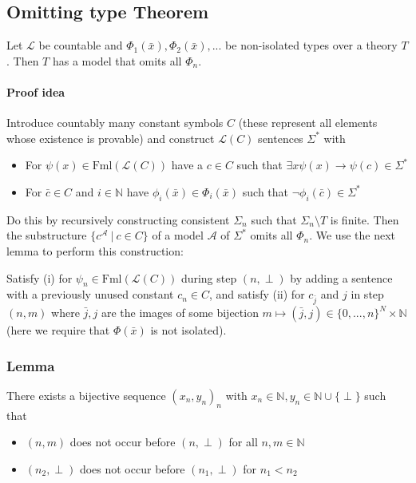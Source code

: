 \documentclass{scrartcl}
\newcommand{\N}{\mathbb{N}}
\begin{document}
\subsection{Omitting type Theorem}
\label{omitting_type_theorem}
Let $\mathcal{L}$ be countable and $\Phi_1(\bar{x}), \Phi_2(\bar{x}), ...$ be non-isolated types over a theory $T$.
Then $T$ has a model that omits all $\Phi_n$.
\paragraph{Proof idea} Introduce countably many constant symbols $C$ (these represent all elements whose existence is provable) and construct $\mathcal{L}(C)$ sentences $\Sigma^*$ with
\begin{itemize}
    \item For $\psi(x) \in \mathrm{Fml}(\mathcal{L}(C))$ have a $c \in C$ such that $\exists x \psi(x) \rightarrow \psi(c) \in \Sigma^*$ 
    \item For $\bar{c} \in C$ and $i \in \N$ have $\phi_i(\bar{x}) \in \Phi_i(\bar{x})$ such that $\neg\phi_i(\bar{c}) \in \Sigma^*$
\end{itemize}
Do this by recursively constructing consistent $\Sigma_n$ such that $\Sigma_n \setminus T$ is finite.
Then the substructure $\{ c^{\mathcal{A}} \ | \ c \in C \}$ of a model $\mathcal{A}$ of $\Sigma^*$ omits all $\Phi_n$.
We use the next lemma to perform this construction: 

Satisfy (i) for $\psi_n \in \mathrm{Fml}(\mathcal{L}(C))$ during step $(n, \perp)$ by adding a sentence with a previously unused constant $c_n \in C$, and satisfy (ii) for $c_{\bar{j}}$ and $j$ in step $(n, m)$ where $\bar{j}, j$ are the images of some bijection $m \mapsto (\bar{j}, j) \in \{ 0, ..., n \}^N \times \N$ (here we require that $\Phi(\bar{x})$ is not isolated).

\subsubsection{Lemma}
\label{countable_constraint_sequence}
There exists a bijective sequence $(x_n, y_n)_n$ with $x_n \in \N, y_n \in \N \cup \{\perp\}$ such that 
\begin{itemize}
    \item $(n, m)$ does not occur before $(n, \perp)$ for all $n, m \in \N$
    \item $(n_2, \perp)$ does not occur before $(n_1, \perp)$ for $n_1 < n_2$
\end{itemize}
\end{document}
